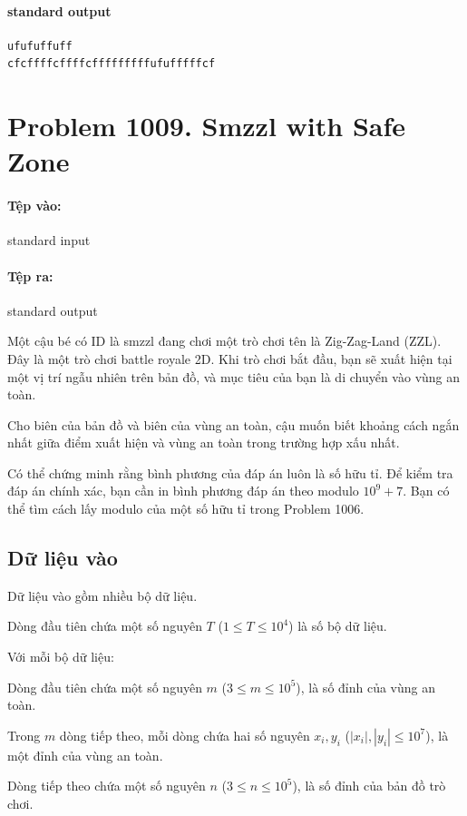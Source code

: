 \documentclass[11pt]{article}
\begin{document}
\paragraph{standard output}
\begin{verbatim}
ufufuffuff
cfcffffcffffcfffffffffufufffffcf
\end{verbatim}

\section{Problem 1009. Smzzl with Safe Zone}

\paragraph{Tệp vào:} standard input
\paragraph{Tệp ra:} standard output

Một cậu bé có ID là smzzl đang chơi một trò chơi tên là Zig-Zag-Land (ZZL).
Đây là một trò chơi battle royale 2D. Khi trò chơi bắt đầu, bạn sẽ xuất hiện
tại một vị trí ngẫu nhiên trên bản đồ, và mục tiêu của bạn là di chuyển vào
vùng an toàn.

Cho biên của bản đồ và biên của vùng an toàn, cậu muốn biết khoảng cách ngắn
nhất giữa điểm xuất hiện và vùng an toàn trong trường hợp xấu nhất.

Có thể chứng minh rằng bình phương của đáp án luôn là số hữu tỉ. Để kiểm tra
đáp án chính xác, bạn cần in bình phương đáp án theo modulo \(10^9+7\). Bạn
có thể tìm cách lấy modulo của một số hữu tỉ trong Problem 1006.

\subsection*{Dữ liệu vào}

Dữ liệu vào gồm nhiều bộ dữ liệu.

Dòng đầu tiên chứa một số nguyên \(T\) (\(1\le T\le 10^4\)) là số bộ dữ liệu.

Với mỗi bộ dữ liệu:

Dòng đầu tiên chứa một số nguyên \(m\) (\(3\le m\le 10^5\)), là số đỉnh của
vùng an toàn.

Trong \(m\) dòng tiếp theo, mỗi dòng chứa hai số nguyên \(x_i,y_i\)
(\(|x_i|,|y_i|\le 10^7\)), là một đỉnh của vùng an toàn.

Dòng tiếp theo chứa một số nguyên \(n\) (\(3\le n\le 10^5\)), là số đỉnh của
bản đồ trò chơi.
\end{document}
